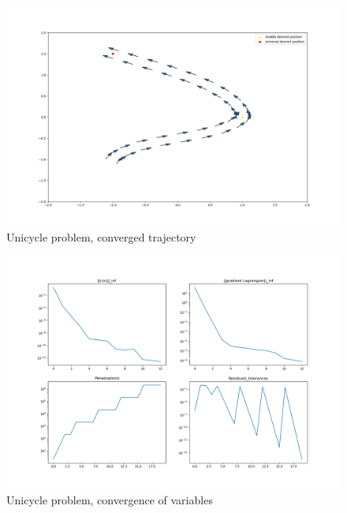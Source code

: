 \documentclass{report}
\begin{document}
\begin{figure}
\centering
\includegraphics[scale=0.4]{Unicycle_car}
\caption{Unicycle problem, converged trajectory}
\end{figure}

\begin{figure}
\centering
\includegraphics[scale=0.4]{Unicycle}
\caption{Unicycle problem, convergence of variables}
\end{figure}
\end{document}
